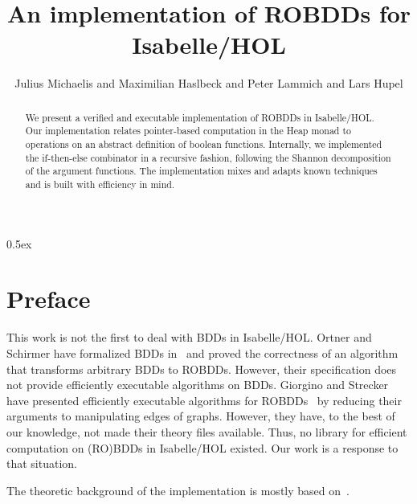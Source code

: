 \documentclass[11pt,a4paper]{article}
\begin{document}
\title{An implementation of ROBDDs for Isabelle/HOL}
\author{Julius Michaelis and Maximilian Haslbeck and Peter Lammich and Lars Hupel}
\maketitle

\begin{abstract}
	We present a verified and executable implementation of ROBDDs in Isabelle/HOL.
	Our implementation relates pointer-based computation in the Heap monad to operations on an abstract definition of boolean functions.
	Internally, we implemented the if-then-else combinator in a recursive fashion, following the Shannon decomposition of the argument functions.
	The implementation mixes and adapts known techniques and is built with efficiency in mind.
\end{abstract}

\tableofcontents

\parindent 0pt\parskip 0.5ex

\section{Preface}
This work is not the first to deal with BDDs in Isabelle/HOL.
Ortner and Schirmer have formalized BDDs in~\cite{BDD-AFP} and proved the correctness of an algorithm that transforms arbitrary BDDs to ROBDDs.
However, their specification does not provide efficiently executable algorithms on BDDs.
Giorgino and Strecker have presented efficiently executable algorithms for ROBDDs~\cite{giorgino2012correctness} by reducing their arguments to manipulating edges of graphs.
However, they have, to the best of our knowledge, not made their theory files available.
Thus, no library for efficient computation on (RO)BDDs in Isabelle/HOL existed.
Our work is a response to that situation.

The theoretic background of the implementation is mostly based on~\cite{brace1991efficient}.






\end{document}
